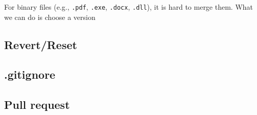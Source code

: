\documentclass{beamer}
\begin{document}
			\begin{frame}
				For binary files (e.g., \texttt{.pdf}, \texttt{.exe}, \texttt{.docx}, \texttt{.dll}), it is hard to merge them. What we can do is choose a version
			\end{frame}

		\subsection{Revert/Reset}

		\subsection{.gitignore}

		\subsection{Pull request}
\end{document}
